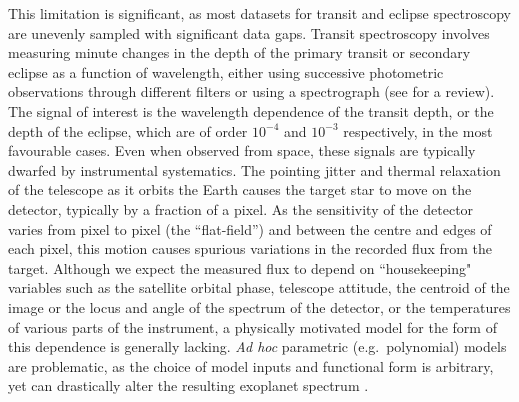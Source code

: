 \documentclass[letterpaper]{ar-1col}
\begin{document}
This limitation is significant, as most datasets for transit and eclipse spectroscopy are unevenly sampled with significant data gaps. Transit spectroscopy involves measuring minute changes in the depth of the primary transit or secondary eclipse as a function of wavelength, either using successive photometric observations through different filters or using a spectrograph (see \citealt {2018haex.bookE.100K} for a review). The signal of interest is the wavelength dependence of the transit depth, or the depth of the eclipse, which are of order $10^{-4}$ and $10^{-3}$ respectively, in  the most favourable cases. Even when observed from space, these signals are typically dwarfed by instrumental systematics. The pointing jitter and thermal relaxation of the telescope as it orbits the Earth causes the target star to move on the detector, typically by a fraction of a pixel. As the sensitivity of the detector varies from pixel to pixel (the ``flat-field'') and between the centre and edges of each pixel, this motion causes spurious variations in the recorded flux from the target. Although we expect the measured flux to depend on ``housekeeping" variables such as the satellite orbital phase, telescope attitude, the centroid of the image or the locus and angle of the spectrum of the detector, or the temperatures of various parts of the instrument, a physically motivated model for the form of this dependence is generally lacking. \textit{Ad hoc} parametric (e.g.\ polynomial) models are problematic, as the choice of model inputs and functional form is arbitrary, yet can drastically alter the resulting exoplanet spectrum \citep{2011MNRAS.411.2199G}.
\end{document}
